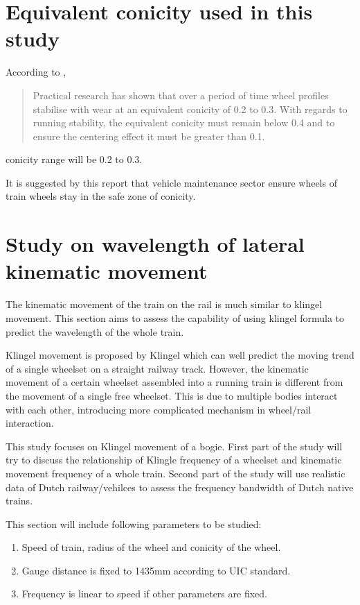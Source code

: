 \section{Equivalent conicity used in this study}
According to \citet[Section.2.6]{esveld2001modern}, 

\begin{quote}
    Practical research has shown that over a period of time wheel profiles stabilise with wear at an equivalent conicity of 0.2 to 0.3. With regards to running stability, the equivalent conicity must remain below 0.4 and to ensure the centering effect it must be greater than 0.1.
\end{quote}

conicity range will be 0.2 to 0.3.

It is suggested by this report that vehicle maintenance sector ensure wheels of train wheels stay in the safe zone of conicity. 


\section{Study on wavelength of lateral kinematic movement}

The kinematic movement of the train on the rail is much similar to klingel movement. This section aims to assess the capability of using klingel formula to predict the wavelength of the whole train.

Klingel movement is proposed by Klingel which can well predict the moving trend of a single wheelset on a straight railway track. However, the kinematic movement of a certain wheelset assembled into a running train is different from the movement of a single free wheelset. This is due to multiple bodies interact with each other, introducing more complicated mechanism in wheel/rail interaction. 

This  study focuses on Klingel movement of a bogie. First part of the  study will try to discuss the relationship of Klingle frequency of a wheelset and kinematic movement frequency of a whole train. Second part of the study will use realistic data of Dutch railway/vehilces to assess the frequency bandwidth of Dutch native trains.

This section will include following parameters to be studied:

\begin{enumerate}[-]
	\item Speed of train, radius of the wheel and conicity of the wheel. 
	\item Gauge distance is fixed to 1435mm according to UIC standard. 
	\item Frequency is linear to speed if other parameters are fixed.
\end{enumerate}


